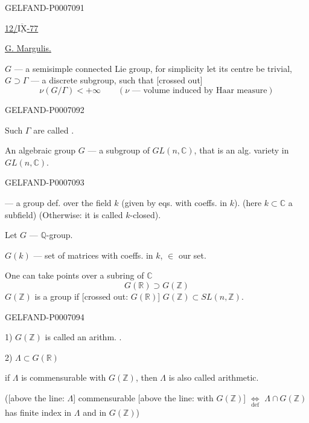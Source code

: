 \begin{GelfandAdjacentEvidence}{GELFAND-P000709}{1}

\underline{12/\(\overline{\underline{\mathrm{IX}}}\)-77 }\quad
{}

\underline{G. Margulis.}

\(G\) --- a semisimple connected Lie group, for simplicity let its centre be trivial,
\(G\supset\Gamma\) --- a discrete subgroup, such that [crossed out]
\[
\nu(G/\Gamma)<+\infty
\qquad(\nu\text{ --- volume induced by Haar measure})
\]
\end{GelfandAdjacentEvidence}
\begin{GelfandAdjacentEvidence}{GELFAND-P000709}{2}

Such \(\Gamma\) are called .

An algebraic group \(G\) --- a subgroup of \(GL(n,\mathbb C)\), that is an alg. variety in \(GL(n,\mathbb C)\).
\end{GelfandAdjacentEvidence}
\begin{GelfandAdjacentEvidence}{GELFAND-P000709}{3}


 --- a group def. over the field \(k\)
(given by eqs. with coeffs. in \(k\)). (here \(k\subset\mathbb C\) a subfield)
(Otherwise: it is called \(k\)-closed).

Let \(G\) --- \(\mathbb Q\)-group.

\(G(k)\) --- set of matrices with coeffs. in \(k\), \(\in\) our set.

One can take points over a subring of \(\mathbb C\)
\[
G(\mathbb R)\supset G(\mathbb Z)
\]
\(G(\mathbb Z)\) is a group if [crossed out: \(G(\mathbb R)\)]
\(G(\mathbb Z)\subset SL(n,\mathbb Z)\).
\end{GelfandAdjacentEvidence}
\begin{GelfandAdjacentEvidence}{GELFAND-P000709}{4}


1) \(G(\mathbb Z)\) is called an arithm. .

2) \(\Lambda\subset G(\mathbb R)\)

if \(\Lambda\) is commensurable with \(G(\mathbb Z)\), then
\(\Lambda\) is also called arithmetic.

([above the line: \(\Lambda\)] commensurable [above the line: with \(G(\mathbb Z)\)]
\(\underset{\mathrm{def}}{\Longleftrightarrow}\)
\(\Lambda\cap G(\mathbb Z)\) has finite index in \(\Lambda\) and in \(G(\mathbb Z)\))
\end{GelfandAdjacentEvidence}
